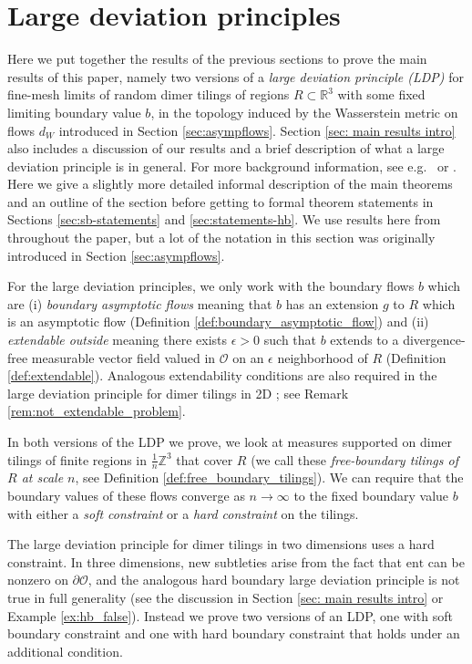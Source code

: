 \documentclass[11pt]{article}
\theoremstyle{remark}
\theoremstyle{definition}
\newcommand{\ent}{\text{ent}}
\newcommand{\mc}[1]{\mathcal{#1}}
\newcommand{\m}[1]{\mathbb{#1}}
\begin{document}
\section{Large deviation principles}\label{sec:ldp}

Here we put together the results of the previous sections to prove the main results of this paper, namely two versions of a \textit{large deviation principle (LDP)} for fine-mesh limits of random dimer tilings of regions $R\subset \m R^3$ with some fixed limiting boundary value $b$, in the topology induced by the Wasserstein metric on flows $d_W$ introduced in Section \ref{sec:asympflows}. Section \ref{sec: main results intro} also includes a discussion of our results and a brief description of what a large deviation principle is in general. For more background information, see e.g.\ \cite{dembo2009large} or \cite{varadhan2016large}. Here we give a slightly more detailed informal description of the main theorems and an outline of the section before getting to formal theorem statements in Sections \ref{sec:sb-statements} and \ref{sec:statements-hb}. We use results here from throughout the paper, but a lot of the notation in this section was originally introduced in Section \ref{sec:asympflows}. 

For the large deviation principles, we only work with the boundary flows $b$ which are (i) \textit{boundary asymptotic flows} meaning that $b$ has an extension $g$ to $R$ which is an asymptotic flow (Definition \ref{def:boundary_asymptotic_flow}) and (ii) \textit{extendable outside} meaning there exists $\epsilon>0$ such that $b$ extends to a divergence-free measurable vector field valued in $\mc O$ on an $\epsilon$ neighborhood of $R$ (Definition \ref{def:extendable}). Analogous extendability conditions are also required in the large deviation principle for dimer tilings in 2D \cite{cohn2001variational}; see Remark \ref{rem:not_extendable_problem}. 


In both versions of the LDP we prove, we look at measures supported on dimer tilings of finite regions in $\frac{1}{n} \m Z^3$ that cover $R$ (we call these \textit{free-boundary tilings of $R$ at scale $n$}, see Definition \ref{def:free_boundary_tilings}). We can require that the boundary values of these flows converge as $n\to \infty$ to the fixed boundary value $b$ with either a \textit{soft constraint} or a \textit{hard constraint} on the tilings. 

The large deviation principle for dimer tilings in two dimensions \cite{cohn2001variational} uses a hard constraint. In three dimensions, new subtleties arise from the fact that $\ent$ can be nonzero on $\partial \mc O$, and the analogous hard boundary large deviation principle is not true in full generality (see the discussion in Section \ref{sec: main results intro} or Example \ref{ex:hb_false}). Instead we prove two versions of an LDP, one with soft boundary constraint and one with hard boundary constraint that holds under an additional condition.
\end{document}
